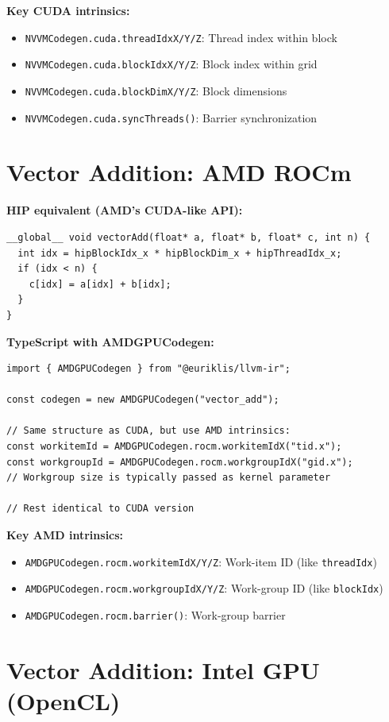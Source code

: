 \documentclass[11pt,oneside]{book}
\begin{document}
\textbf{Key CUDA intrinsics:}
\begin{itemize}[noitemsep]
  \item \texttt{NVVMCodegen.cuda.threadIdxX/Y/Z}: Thread index within block
  \item \texttt{NVVMCodegen.cuda.blockIdxX/Y/Z}: Block index within grid
  \item \texttt{NVVMCodegen.cuda.blockDimX/Y/Z}: Block dimensions
  \item \texttt{NVVMCodegen.cuda.syncThreads()}: Barrier synchronization
\end{itemize}

\section{Vector Addition: AMD ROCm}

\textbf{HIP equivalent (AMD's CUDA-like API):}
\begin{lstlisting}[style=ir]
__global__ void vectorAdd(float* a, float* b, float* c, int n) {
  int idx = hipBlockIdx_x * hipBlockDim_x + hipThreadIdx_x;
  if (idx < n) {
    c[idx] = a[idx] + b[idx];
  }
}
\end{lstlisting}

\textbf{TypeScript with AMDGPUCodegen:}
\begin{lstlisting}[style=ts]
import { AMDGPUCodegen } from "@euriklis/llvm-ir";

const codegen = new AMDGPUCodegen("vector_add");

// Same structure as CUDA, but use AMD intrinsics:
const workitemId = AMDGPUCodegen.rocm.workitemIdX("tid.x");
const workgroupId = AMDGPUCodegen.rocm.workgroupIdX("gid.x");
// Workgroup size is typically passed as kernel parameter

// Rest identical to CUDA version
\end{lstlisting}

\textbf{Key AMD intrinsics:}
\begin{itemize}[noitemsep]
  \item \texttt{AMDGPUCodegen.rocm.workitemIdX/Y/Z}: Work-item ID (like \texttt{threadIdx})
  \item \texttt{AMDGPUCodegen.rocm.workgroupIdX/Y/Z}: Work-group ID (like \texttt{blockIdx})
  \item \texttt{AMDGPUCodegen.rocm.barrier()}: Work-group barrier
\end{itemize}

\section{Vector Addition: Intel GPU (OpenCL)}
\end{document}
